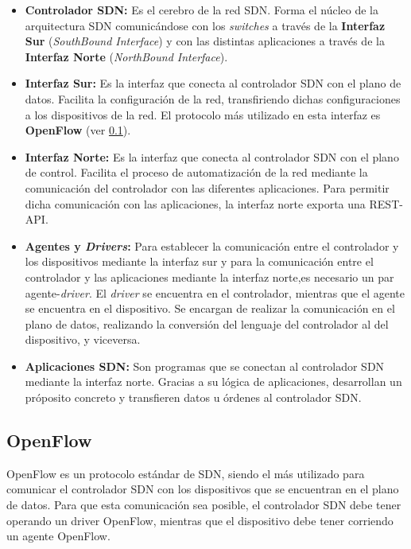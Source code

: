 \begin{itemize}
	\item \textbf{Controlador SDN:} Es el cerebro de la red SDN. Forma el núcleo de la arquitectura SDN comunicándose con los \textit{switches} a través de la \textbf{Interfaz Sur} (\textit{SouthBound Interface}) y con las distintas aplicaciones a través de la \textbf{Interfaz Norte} (\textit{NorthBound Interface}).
	
	\item \textbf{Interfaz Sur:} Es la interfaz que conecta al controlador SDN con el plano de datos. Facilita la configuración de la red, transfiriendo dichas configuraciones a los dispositivos de la red. El protocolo más utilizado en esta interfaz es \textbf{OpenFlow} (ver \ref{subsec:openflow}).
	
	\item \textbf{Interfaz Norte:} Es la interfaz que conecta al controlador SDN con el plano de control. Facilita el proceso de automatización de la red mediante la comunicación del controlador con las diferentes aplicaciones. Para permitir dicha comunicación con las aplicaciones, la interfaz norte exporta una REST-API.
	
	\item \textbf{Agentes y \textit{Drivers}:} Para establecer la comunicación entre el controlador y los dispositivos mediante la interfaz sur y para la comunicación entre el controlador y las aplicaciones mediante la interfaz norte,es necesario un par agente-\textit{driver}. El \textit{driver} se encuentra en el controlador, mientras que el agente se encuentra en el dispositivo. Se encargan de realizar la comunicación en el plano de datos, realizando la conversión del lenguaje del controlador al del dispositivo, y viceversa.
	
	\item \textbf{Aplicaciones SDN:} Son programas que se conectan al controlador SDN mediante la interfaz norte. Gracias a su lógica de aplicaciones, desarrollan un próposito concreto y transfieren datos u órdenes al controlador SDN.
\end{itemize}


\subsection{OpenFlow}
\label{subsec:openflow}

OpenFlow\cite{openflowbib} es un protocolo estándar de SDN, siendo el más utilizado para comunicar el controlador SDN con los dispositivos que se encuentran en el plano de datos. Para que esta comunicación sea posible, el controlador SDN debe tener operando un driver OpenFlow, mientras que el dispositivo debe tener corriendo un agente OpenFlow. 

